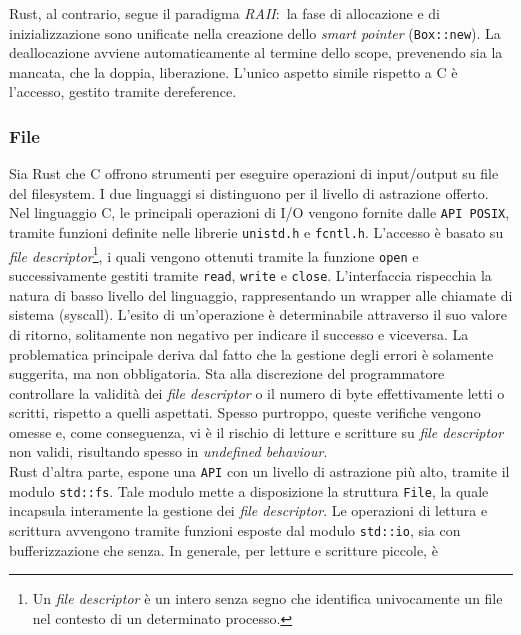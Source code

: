 Rust, al contrario, segue il paradigma \textit{RAII}:\  la fase di allocazione e di inizializzazione sono unificate nella creazione dello \textit{smart pointer} (\texttt{Box::new}). La deallocazione 
avviene automaticamente al termine dello scope, prevenendo sia la mancata, che la doppia, liberazione. L'unico aspetto simile rispetto a C è l'accesso, gestito tramite dereference.

\subsubsection{File}
Sia Rust che C offrono strumenti per eseguire operazioni di input/output su file del filesystem. I due linguaggi si distinguono per
il livello di astrazione offerto. \hfill
\vspace{10pt}\\
\noindent Nel linguaggio C, le principali operazioni di I/O vengono fornite dalle \texttt{API POSIX}, tramite funzioni definite nelle librerie \texttt{unistd.h} e \texttt{fcntl.h}.
L'accesso è basato su \textit{file descriptor}\footnote{Un \textit{file descriptor} è un intero senza segno che identifica univocamente un file nel contesto di un determinato processo.}, 
i quali vengono ottenuti tramite la funzione \texttt{open} e successivamente gestiti tramite \texttt{read}, \texttt{write} e \texttt{close}.
L'interfaccia rispecchia la natura di basso livello del linguaggio, rappresentando un wrapper alle chiamate di sistema (syscall). L'esito di un'operazione è determinabile attraverso il suo valore di ritorno, solitamente non negativo per indicare il successo e viceversa.
La problematica principale deriva dal fatto che la gestione degli errori è solamente suggerita, ma non obbligatoria. Sta alla discrezione del programmatore controllare la validità dei \textit{file descriptor}
 o il numero di byte effettivamente letti o scritti, rispetto a quelli aspettati.
Spesso purtroppo, queste verifiche vengono omesse e, come conseguenza, vi è il rischio di letture e scritture su \textit{file descriptor} non validi, risultando spesso in \textit{undefined behaviour}. \hfill
\vspace{10pt}\\
\noindent Rust d'altra parte, espone una \texttt{API} con un livello di astrazione più alto, tramite il modulo \texttt{std::fs}. Tale modulo mette a disposizione la struttura \texttt{File}, la quale 
incapsula interamente la gestione dei \textit{file descriptor}.
Le operazioni di lettura e scrittura avvengono tramite funzioni esposte dal modulo \texttt{std::io}, sia con bufferizzazione che senza. In generale, per letture e scritture piccole, è
